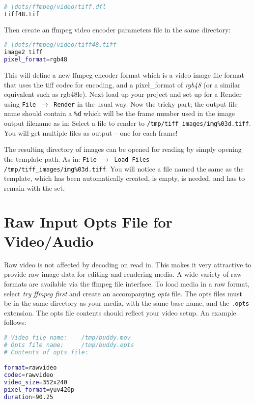 \begin{lstlisting}[language=bash,numbers=none]
# \dots/ffmpeg/video/tiff.dfl
tiff48.tif
\end{lstlisting}

Then create an ffmpeg video encoder parameters file in the same directory:

\begin{lstlisting}[language=bash,numbers=none]
# \dots/ffmpeg/video/tiff48.tiff
image2 tiff
pixel_format=rgb48
\end{lstlisting}

This will define a new ffmpeg encoder format which is a video image file format that uses the tiff codec for encoding, and a pixel\_format of \textit{rgb48} (or a similar equivalent such as rgb48le).  Next load up your project and set up for a Render using \texttt{File $\rightarrow$ Render} in the usual way.  Now the tricky part; the output file name should contain a \texttt{\%d} which will be the frame number used in the image output filename as in:  Select a file to render to  \texttt{/tmp/tiff\_images/img\%03d.tiff}.  You will get multiple files as output -- one for each frame!

The resulting directory of images can be opened for reading by simply opening the template path.  As in: \texttt{File $\rightarrow$ Load Files} \texttt{/tmp/tiff\_images/img\%03d.tiff}.  You will notice a file named the same as the template, which has been automatically created, is empty, is needed, and has to remain with the set.

\section{Raw Input Opts File for Video/Audio}%
\label{sec:raw_input_opts_video_audio}

Raw video is not affected by decoding on read in.  This makes it very attractive to provide raw image data for editing and rendering media.  A wide variety of raw formats are available via the ffmpeg file interface.  To load media in a raw format, select \textit{try ffmpeg first} and create an accompanying \textit{opts} file.  The opts files must be in the same directory as your media, with the same base name, and the \texttt{.opts} extension.  The opts file contents should reflect your video setup.  An example follows:

\begin{lstlisting}[language=bash,numbers=none]
# Video file name:    /tmp/buddy.mov
# Opts file name:     /tmp/buddy.opts
# Contents of opts file:

format=rawvideo
codec=rawvideo
video_size=352x240
pixel_format=yuv420p
duration=90.25
\end{lstlisting}


